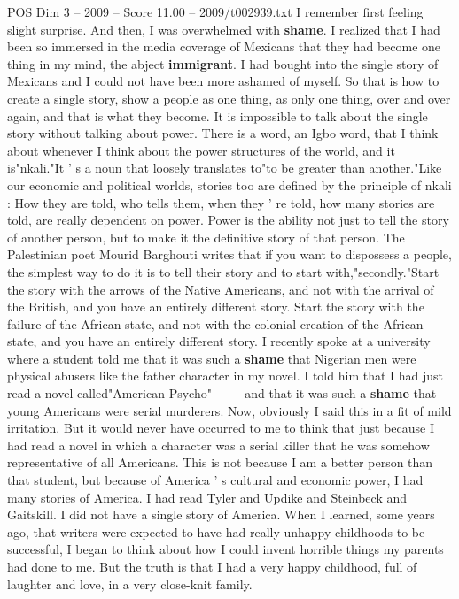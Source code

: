 \begin{textsample}{POS Dim 3 – 2009 – Score 11.00 – 2009/t002939.txt}
I remember first feeling slight surprise.
And then, I was overwhelmed with \textbf{shame}.
I realized that I had been so immersed in the media coverage of Mexicans that they had become one thing in my mind, the abject \textbf{immigrant}.
I had bought into the single story of Mexicans and I could not have been more ashamed of myself.
So that is how to create a single story, show a people as one thing, as only one thing, over and over again, and that is what they become.
It is impossible to talk about the single story without talking about power.
There is a word, an Igbo word, that I think about whenever I think about the power structures of the world, and it is"nkali."It ' s a noun that loosely translates to"to be greater than another."Like our economic and political worlds, stories too are defined by the principle of nkali : How they are told, who tells them, when they ' re told, how many stories are told, are really dependent on power.
Power is the ability not just to tell the story of another person, but to make it the definitive story of that person.
The Palestinian poet Mourid Barghouti writes that if you want to dispossess a people, the simplest way to do it is to tell their story and to start with,"secondly."Start the story with the arrows of the Native Americans, and not with the arrival of the British, and you have an entirely different story.
Start the story with the failure of the African state, and not with the colonial creation of the African state, and you have an entirely different story.
I recently spoke at a university where a student told me that it was such a \textbf{shame} that Nigerian men were physical abusers like the father character in my novel.
I told him that I had just read a novel called"American Psycho"— — and that it was such a \textbf{shame} that young Americans were serial murderers.
Now, obviously I said this in a fit of mild irritation.
But it would never have occurred to me to think that just because I had read a novel in which a character was a serial killer that he was somehow representative of all Americans.
This is not because I am a better person than that student, but because of America ' s cultural and economic power, I had many stories of America.
I had read Tyler and Updike and Steinbeck and Gaitskill.
I did not have a single story of America.
When I learned, some years ago, that writers were expected to have had really unhappy childhoods to be successful, I began to think about how I could invent horrible things my parents had done to me.
But the truth is that I had a very happy childhood, full of laughter and love, in a very close-knit family.

\end{textsample}
